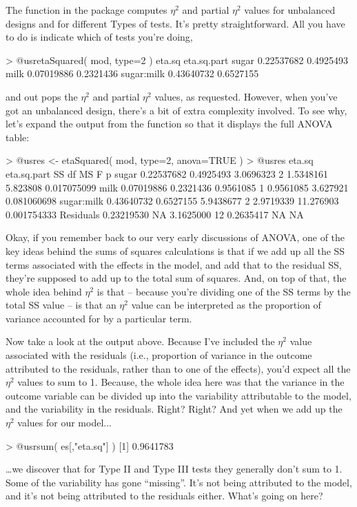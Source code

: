 
The  function in the  package computes $\eta^2$ and partial $\eta^2$ values for unbalanced designs and for different Types of tests. It's pretty straightforward. All you have to do is indicate which  of tests you're doing,
\begin{rblock1}
> @usr{etaSquared( mod, type=2 )}
               eta.sq eta.sq.part
sugar      0.22537682   0.4925493
milk       0.07019886   0.2321436
sugar:milk 0.43640732   0.6527155
\end{rblock1}
and out pops the $\eta^2$ and partial $\eta^2$ values, as requested. However, when you've got an unbalanced design, there's a bit of extra complexity involved. To see why, let's expand the output from the  function so that it displays the full ANOVA table:
\begin{rblock1}
> @usr{es <- etaSquared( mod, type=2, anova=TRUE )}
> @usr{es}
               eta.sq eta.sq.part        SS df        MS         F           p
sugar      0.22537682   0.4925493 3.0696323  2 1.5348161  5.823808 0.017075099
milk       0.07019886   0.2321436 0.9561085  1 0.9561085  3.627921 0.081060698
sugar:milk 0.43640732   0.6527155 5.9438677  2 2.9719339 11.276903 0.001754333
Residuals  0.23219530          NA 3.1625000 12 0.2635417        NA          NA
\end{rblock1}
Okay, if you remember back to our very early discussions of ANOVA, one of the key ideas behind the sums of squares calculations is that 
if we add up all the SS terms associated with the effects in the model, and add that to the residual SS, they're supposed to add up to the total sum of squares. And, on top of that, the whole idea behind $\eta^2$ is that -- because you're dividing one of the SS terms by the total SS value -- is that an $\eta^2$ value can be interpreted as the proportion of variance accounted for by a particular term. 

Now take a look at the output above. Because I've included the $\eta^2$ value associated with the residuals (i.e., proportion of variance in the outcome attributed to the residuals, rather than to one of the effects), you'd expect all the $\eta^2$ values to sum to 1. Because, the whole idea here was that the variance in the outcome variable can be divided up into the variability attributable to the model, and the variability in the residuals. Right? Right? And yet when we add up the $\eta^2$ values for our model...
\begin{rblock1}
> @usr{sum( es[,"eta.sq"] )}
[1] 0.9641783
\end{rblock1}
\ldots we discover that for Type II and Type III tests they generally don't sum to 1. Some of the variability has gone ``missing''. It's not being attributed to the model, and it's not being attributed to the residuals either. What's going on here?

